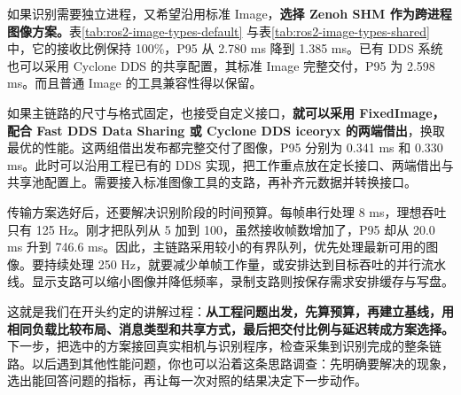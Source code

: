 如果识别需要独立进程，又希望沿用标准 Image，\textbf{选择 Zenoh SHM 作为跨进程图像方案。}表\ref{tab:ros2-image-types-default} 与表\ref{tab:ros2-image-types-shared} 中，它的接收比例保持 100\%，P95 从 2.780 ms 降到 1.385 ms。已有 DDS 系统也可以采用 Cyclone DDS 的共享配置，其标准 Image 完整交付，P95 为 2.598 ms。而且普通 Image 的工具兼容性得以保留。

如果主链路的尺寸与格式固定，也接受自定义接口，\textbf{就可以采用 FixedImage，配合 Fast DDS Data Sharing 或 Cyclone DDS iceoryx 的两端借出}，换取最优的性能。这两组借出发布都完整交付了图像，P95 分别为 0.341 ms 和 0.330 ms。此时可以沿用工程已有的 DDS 实现，把工作重点放在定长接口、两端借出与共享池配置上。需要接入标准图像工具的支路，再补齐元数据并转换接口。

传输方案选好后，还要解决识别阶段的时间预算。每帧串行处理 8 ms，理想吞吐只有 125 Hz。刚才把队列从 5 加到 100，虽然接收帧数增加了，P95 却从 20.0 ms 升到 746.6 ms。因此，主链路采用较小的有界队列，优先处理最新可用的图像。要持续处理 250 Hz，就要减少单帧工作量，或安排达到目标吞吐的并行流水线。显示支路可以缩小图像并降低频率，录制支路则按保存需求安排缓存与写盘。

这就是我们在开头约定的讲解过程：\textbf{从工程问题出发，先算预算，再建立基线，用相同负载比较布局、消息类型和共享方式，最后把交付比例与延迟转成方案选择。}下一步，把选中的方案接回真实相机与识别程序，检查采集到识别完成的整条链路。以后遇到其他性能问题，你也可以沿着这条思路调查：先明确要解决的现象，选出能回答问题的指标，再让每一次对照的结果决定下一步动作。
